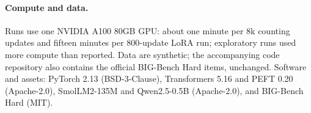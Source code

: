 \paragraph{Compute and data.} Runs use one NVIDIA A100 80GB GPU: about one minute per $8$k counting updates and fifteen minutes per
$800$-update LoRA run; exploratory runs used more compute than reported. Data are synthetic; the accompanying code repository also
contains the official BIG-Bench Hard items, unchanged. Software and assets: PyTorch 2.13 (BSD-3-Clause), Transformers 5.16 and PEFT 0.20 (Apache-2.0), SmolLM2-135M
\citep{allal2025smollm2} and Qwen2.5-0.5B \citep{qwen2025qwen25} (Apache-2.0), and BIG-Bench Hard \citep{suzgun2022challenging} (MIT).
